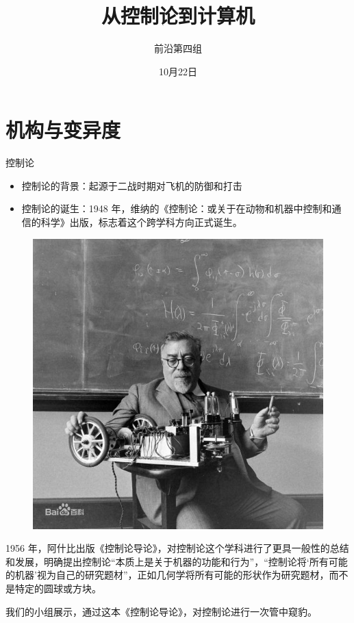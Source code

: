 \documentclass[12pt,AutoFakeBold,aspectratio=43,mathserif]{beamer}
\title{从控制论到计算机}
\author{前沿第四组}
\date{10月22日}
\begin{document}
    \begin{frame}
        \titlepage
    
    \end{frame}
    
    \section{机构与变异度}
    	\begin{frame}{控制论}
    		\begin{itemize}
    			\item 控制论的背景：起源于二战时期对飞机的防御和打击
    			\item 控制论的诞生：1948 年，维纳的《控制论：或关于在动物和机器中控制和通信的科学》出版，标志着这个跨学科方向正式诞生。
            \end{itemize}
            \begin{figure}
                \centering
                \includegraphics[width=.3\paperwidth]{figures/figure1_1.jpg}
            \end{figure}
    	    
    		\end{frame}
    	\begin{frame}
    		1956 年，阿什比出版《控制论导论》，对控制论这个学科进行了更具一般性的总结和发展，明确提出控制论“本质上是关于机器的功能和行为”，“控制论将‘所有可能的机器’视为自己的研究题材”，正如几何学将所有可能的形状作为研究题材，而不是特定的圆球或方块。
    		
    		
    		我们的小组展示，通过这本《控制论导论》，对控制论进行一次管中窥豹。
    		
    	\end{frame}
    	
\end{document}
